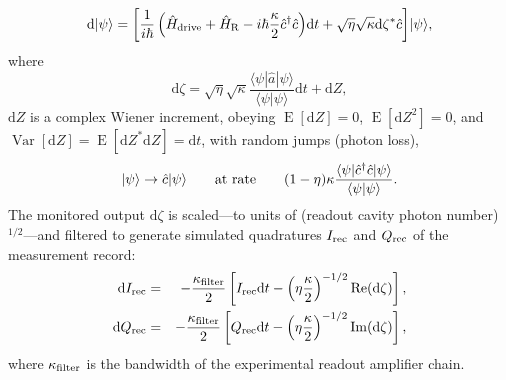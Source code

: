 \documentclass[
						superscriptaddress, 																 amsmath, amssymb,
		 aps,  prb,  
										floatfix,
		linenumbers,
			]{revtex4-1}
\begin{document}
\begin{equation}
\mathrm{d}|\psi\rangle=\left[\frac1{i\hbar}\left(\hat H_{\rm drive}+\hat H_{\rm R}-i\hbar\frac\kappa2\hat c^\dagger\hat c\right)\mkern-3mu\mathrm{d}t+\sqrt\eta\sqrt{\kappa}\mathrm{d}\zeta^{*}\hat c\right]\mkern-3mu|\psi\rangle,
\label{eqn:SSE_continuous}
\end{equation}
where
\begin{equation}
\label{eq:heterodyne-current}
\mathrm{d}\zeta=\sqrt\eta\sqrt\kappa\frac{\langle\psi|\hat a |\psi\rangle}{\langle\psi|\psi\rangle}\mathrm{d}t+\mathrm{d}Z,
\end{equation}
$\mathrm{d}Z$  is a complex Wiener increment, obeying $\operatorname{E}\left[\mathrm{d}Z\right]=0$, $\operatorname{E}\left[\mathrm{d}Z^{2}\right]=0$, and~$\operatorname{Var}\left[\mathrm{d}Z\right]=\operatorname{E}\left[\mathrm{d}Z^{*}\mathrm{d}Z\right]=\mathrm{d}t$, with random jumps (photon loss),
\begin{equation}
|\psi\rangle\to\hat c|\psi\rangle\qquad\hbox{at rate}\qquad(1-\eta)\kappa\frac{\langle\psi|\hat c^\dagger\hat c|\psi\rangle}{\langle\psi|\psi\rangle}.
\end{equation}
The monitored output $\mathrm{d}\zeta$ is scaled---to units of (readout cavity photon number)${}^{1/2}$---and filtered to generate simulated quadratures $I_{\rm rec}$ and $Q_{\rm rec}$ of the measurement record:
\begin{eqnarray}
\label{eq:dI_rec}
\mathrm{d}I_{\rm rec}&=&-\frac{\kappa_{\rm filter}}2\left[I_{\rm rec}\mathrm{d}t-\left(\eta\frac\kappa2\right)^{-1/2}{\rm Re}(\mathrm{d}\zeta)\right],
\label{eqn:simulated_I_int}\\
\label{eq:dQ_rec}
\mathrm{d}Q_{\rm rec}&=&-\frac{\kappa_{\rm filter}}2\left[Q_{\rm rec}\mathrm{d}t-\left(\eta\frac\kappa2\right)^{-1/2}{\rm Im}(\mathrm{d}\zeta)\right],
\label{eqn:simulated_Q_int}
\end{eqnarray}
where $\kappa_{\rm filter}$ is the bandwidth of the experimental readout amplifier chain.
\end{document}
